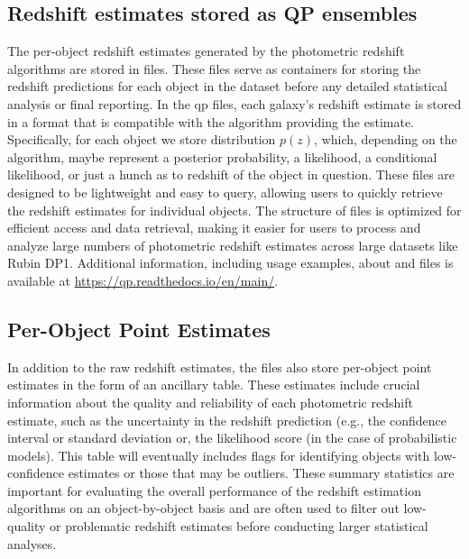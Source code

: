 \subsection{Redshift estimates stored as QP ensembles}
\label{sec:products:qp_ensembles}

The per-object redshift estimates generated by the photometric redshift algorithms are stored in  files.  These files serve as containers for storing the redshift predictions for each object in the dataset before any detailed statistical analysis or final reporting.  In the qp files, each galaxy’s redshift estimate is stored in a format that is compatible with the algorithm providing the estimate.   Specifically, for each object we store distribution $p(z)$, which, depending on the algorithm, maybe represent a posterior probability, a likelihood, a conditional likelihood, or just a hunch as to redshift of the object in question.   These  files are designed to be lightweight and easy to query, allowing users to quickly retrieve the redshift estimates for individual objects.  The structure of  files is optimized for efficient access and data retrieval, making it easier for users to process and analyze large numbers of photometric redshift estimates across large datasets like Rubin DP1.  Additional information, including usage examples, about  and  files is available at \href{https://qp.readthedocs.io/en/main/}{https://qp.readthedocs.io/en/main/}.


\subsection{Per-Object Point Estimates}
\label{sec:products:summary_statistics}

In addition to the raw redshift estimates, the  files also store per-object point estimates in the form of an ancillary table.  These estimates include crucial information about the quality and reliability of each photometric redshift estimate, such as the uncertainty in the redshift prediction (e.g., the confidence interval or standard deviation or, the likelihood score (in the case of probabilistic models).   This table will eventually includes flags for identifying objects with low-confidence estimates or those that may be outliers.  These summary statistics are important for evaluating the overall performance of the redshift estimation algorithms on an object-by-object basis and are often used to filter out low-quality or problematic redshift estimates before conducting larger statistical analyses.

